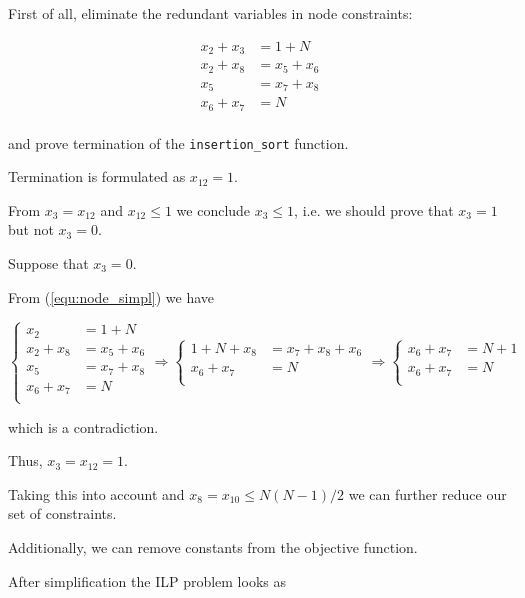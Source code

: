 \documentclass[12pt,a4paper,titlepage,oneside]{article}
\begin{document}
\begin{itemize}
First of all, eliminate the redundant variables in node constraints:

\begin{equation}
\left.\begin{aligned}
x_2 + x_3 &= 1 + N\\
x_2 + x_8 &= x_5 + x_6\\
x_5 &= x_7 + x_8\\
x_6 + x_7 &= N\\
\end{aligned}\right.
\label{equ:node_simpl}
\end{equation}

and prove termination of the \texttt{insertion\_sort} function.

Termination is formulated as $x_{12} = 1$.

From $x_3 = x_{12}$ and $x_{12} \leq 1$ we conclude $x_3 \leq 1$, i.e. we should prove that $x_3 = 1$ but not $x_3 = 0$.


Suppose that $x_3 = 0$.

From (\ref{equ:node_simpl}) we have

\begin{equation*}
\left\{\begin{aligned}
x_2 &= 1 + N\\
x_2 + x_8 &= x_5 + x_6\\
x_5 &= x_7 + x_8\\
x_6 + x_7 &= N\\
\end{aligned}\right.
\Rightarrow
\left\{\begin{aligned}
1 + N + x_8 &= x_7 + x_8 + x_6\\
x_6 + x_7 &= N\\
\end{aligned}\right.
\Rightarrow
\left\{\begin{aligned}
x_6 + x_7 &= N+1\\
x_6 + x_7 &= N\\
\end{aligned}\right.
\end{equation*}

which is a contradiction.

Thus, $x_3 = x_{12} = 1$.

Taking this into account and $x_8 = x_{10} \leq N(N-1)/2$ we can further reduce our set of constraints.

Additionally, we can remove constants from the objective function.

After simplification the ILP problem looks as


\end{itemize}
\end{document}
